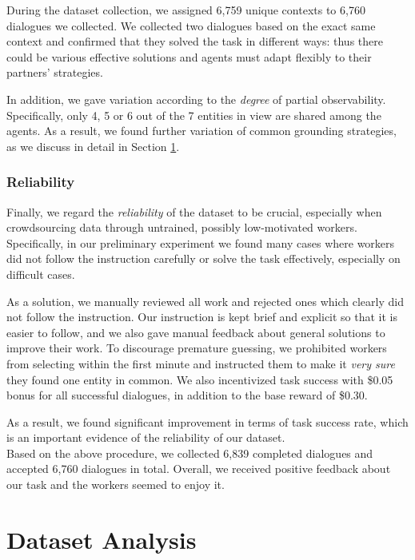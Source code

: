 \documentclass[letterpaper]{article}
\begin{document}
During the dataset collection, we assigned 6,759 unique contexts to 6,760 dialogues we collected. We collected two dialogues based on the exact same context and confirmed that they solved the task in different ways: thus there could be various effective solutions and agents must adapt flexibly to their partners' strategies.

In addition, we gave variation according to the \textit{degree} of partial observability. Specifically, only 4, 5 or 6 out of the 7 entities in view are shared among the agents. As a result, we found further variation of common grounding strategies, as we discuss in detail in Section \ref{section:dataset_analysis}.

\subsubsection{Reliability}

Finally, we regard the \emph{reliability} of the dataset to be crucial, especially when crowdsourcing data through untrained, possibly low-motivated workers. Specifically, in our preliminary experiment we found many cases where workers did not follow the instruction carefully or solve the task effectively, especially on difficult cases.

As a solution, we manually reviewed all work and rejected ones which clearly did not follow the instruction. Our instruction is kept brief and explicit so that it is easier to follow, and we also gave manual feedback about general solutions to improve their work. To discourage premature guessing, we prohibited workers from selecting within the first minute and instructed them to make it \emph{very sure} they found one entity in common. We also incentivized task success with \$0.05 bonus for all successful dialogues, in addition to the base reward of \$0.30.

As a result, we found significant improvement in terms of task success rate, which is an important evidence of the reliability of our dataset. \\

Based on the above procedure, we collected 6,839 completed dialogues and accepted 6,760 dialogues in total. Overall, we received positive feedback about our task and the workers seemed to enjoy it.

\section{Dataset Analysis}
\label{section:dataset_analysis}
\end{document}
